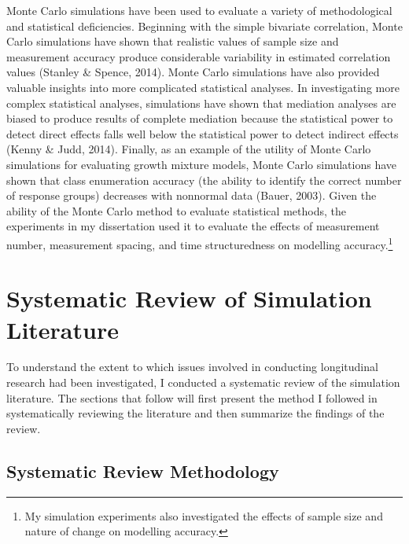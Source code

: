 \documentclass[
12pt, %
twoside,
english]{guelphthesis}
\theoremstyle{definition}
\theoremstyle{definition}
\theoremstyle{definition}
\theoremstyle{definition}
\theoremstyle{remark}
\begin{document}
Monte Carlo simulations have been used to evaluate a variety of methodological and statistical deficiencies. Beginning with the simple bivariate correlation, Monte Carlo simulations have shown that realistic values of sample size and measurement accuracy produce considerable variability in estimated correlation values (Stanley \& Spence, 2014). Monte Carlo simulations have also provided valuable insights into more complicated statistical analyses. In investigating more complex statistical analyses, simulations have shown that mediation analyses are biased to produce results of complete mediation because the statistical power to detect direct effects falls well below the statistical power to detect indirect effects (Kenny \& Judd, 2014). Finally, as an example of the utility of Monte Carlo simulations for evaluating growth mixture models, Monte Carlo simulations have shown that class enumeration accuracy (the ability to identify the correct number of response groups) decreases with nonnormal data (Bauer, 2003). Given the ability of the Monte Carlo method to evaluate statistical methods, the experiments in my dissertation used it to evaluate the effects of measurement number, measurement spacing, and time structuredness on modelling accuracy.\footnote{My simulation experiments also investigated the effects of sample size and nature of change on modelling accuracy.}

\hypertarget{systematic-review-of-simulation-literature}{%
\section{Systematic Review of Simulation Literature}\label{systematic-review-of-simulation-literature}}

To understand the extent to which issues involved in conducting longitudinal research had been investigated, I conducted a systematic review of the simulation literature. The sections that follow will first present the method I followed in systematically reviewing the literature and then summarize the findings of the review.

\hypertarget{systematic-review-methodology}{%
\subsection{Systematic Review Methodology}\label{systematic-review-methodology}}
\end{document}
